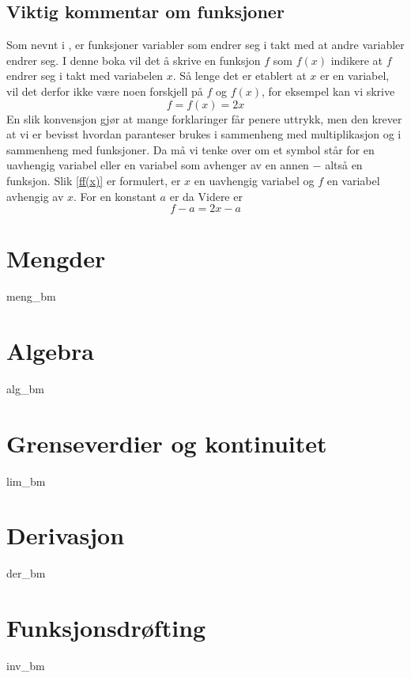 



\addto\captionsenglish{\renewcommand{\contentsname}{Innhold}}


	
	{\footnotesize \tableofcontents}
	\newpage
	
	\section*{Viktig kommentar om funksjoner}
	Som nevnt i \mb, er funksjoner variabler som endrer seg i takt med at andre variabler endrer seg. I denne boka vil det å skrive en funksjon $ f $ som $ f(x) $ indikere at $ f $ endrer seg i takt med variabelen $ x $. Så lenge det er etablert at $ x $ er en variabel, vil det derfor ikke være noen forskjell på $ f $ og $ f(x)$, for eksempel kan vi skrive
	\begin{equation}\label{ff(x)}
		f=f(x)=2x	
	\end{equation} 
	En slik konvensjon gjør at mange forklaringer får penere uttrykk, men den krever at vi er bevisst hvordan paranteser brukes i sammenheng med multiplikasjon og i sammenheng med funksjoner. Da må vi tenke over om et symbol står for en uavhengig variabel eller en variabel som avhenger av en annen $ - $ altså en funksjon. Slik \eqref{ff(x)} er formulert, er $ x $ en uavhengig variabel og $ f $ en variabel avhengig av $ x $. For en konstant $ a $ er da
Videre er
\[ f-a=2x-a \]
	\chapter{Mengder}
	{meng_bm}
	
	\chapter{Algebra}
	{alg_bm}
	
	\chapter{Grenseverdier og kontinuitet}
	{lim_bm}
	
	\chapter{Derivasjon}
	{der_bm}
	
	\chapter{Funksjonsdrøfting}
	{inv_bm}
	
